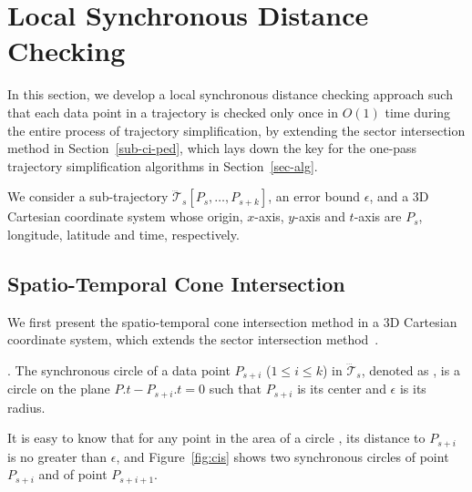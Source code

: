 \section{Local Synchronous Distance Checking}
\label{sec-localcheck}


In this section, we develop a local synchronous distance checking approach such that each data point in a trajectory is checked only once in $O(1)$ time during the entire process of trajectory simplification, by extending the sector intersection method in Section~\ref{sub-ci-ped}, which lays down the key for the one-pass trajectory simplification algorithms in Section~\ref{sec-alg}.

We consider a sub-trajectory $\dddot{\mathcal{T}}_s[P_s, \ldots, P_{s+k}]$, an error bound $\epsilon$, and a 3D Cartesian coordinate system whose origin, $x$-axis, $y$-axis and $t$-axis  are $P_s$, longitude, latitude and time, respectively.

\subsection{Spatio-Temporal Cone Intersection}

We first present the spatio-temporal cone intersection method in a 3D Cartesian coordinate system, which extends the sector intersection method~\cite{ORourke:Intersection}. %





. The synchronous circle of a data point $P_{s+i}$ ($1\le i\le k$) in $\dddot{\mathcal{T}}_s$, denoted as , is a circle on the plane $P.t-P_{s+i}.t = 0$ such that $P_{s+i}$ is its center and $\epsilon$ is its radius.


It is easy to know that for any point in the area of a circle , its distance to $P_{s+i}$ is no greater than $\epsilon$, and
Figure~\ref{fig:cis} shows two synchronous circles  of point $P_{s+i}$ and  of point $P_{s+i+1}$.

